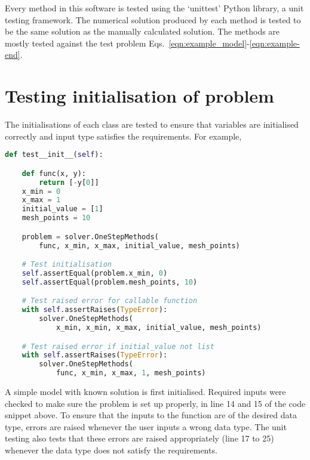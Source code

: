 Every method in this software is tested using the `unittest' Python library, a unit testing framework. The numerical solution produced by each method is tested to be the same solution as the manually calculated solution. The methods are mostly tested against the test problem Eqs.~\eqref{eqn:example_model}-\eqref{eqn:example-end}.

\section{Testing initialisation of problem}
\label{sec:test_init}
The initialisations of each class are tested to ensure that variables are initialised correctly and input type satisfies the requirements. For example, 

\begin{lstlisting}[language=Python, caption= {initialisation testing}, title={Testing initialisation of problem}, label={code:test_init}]
def test__init__(self):

    def func(x, y):
        return [-y[0]]
    x_min = 0
    x_max = 1
    initial_value = [1]
    mesh_points = 10

    problem = solver.OneStepMethods(
        func, x_min, x_max, initial_value, mesh_points)

    # Test initialisation
    self.assertEqual(problem.x_min, 0)
    self.assertEqual(problem.mesh_points, 10)

    # Test raised error for callable function
    with self.assertRaises(TypeError):
        solver.OneStepMethods(
            x_min, x_min, x_max, initial_value, mesh_points)

    # Test raised error if initial_value not list
    with self.assertRaises(TypeError):
        solver.OneStepMethods(
            func, x_min, x_max, 1, mesh_points)
\end{lstlisting}
A simple model with known solution is first initialised. Required inputs were checked to make sure the problem is set up properly, in line 14 and 15 of the code snippet above. To ensure that the inputs to the function are of the desired data type, errors are raised whenever the user inputs a wrong data type. The unit testing also tests that these errors are raised appropriately (line 17 to 25) whenever the data type does not satisfy the requirements. 

